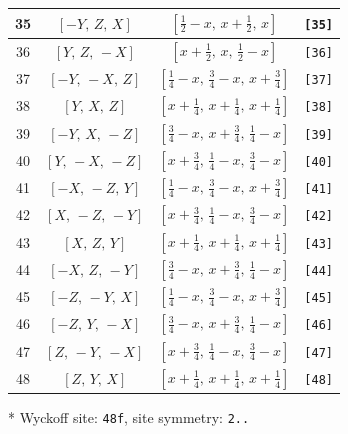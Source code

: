 \documentclass[fleqn,8pt]{jsarticle}
\begin{document}
\begin{longtable}{cccc}
35 & $\left[ - Y,\, Z,\, X \right]$ & $\left[ \frac{1}{2} - x,\, x + \frac{1}{2},\, x \right]$ & {\tt [35]} \\ \hline
36 & $\left[ Y,\, Z,\, - X \right]$ & $\left[ x + \frac{1}{2},\, x,\, \frac{1}{2} - x \right]$ & {\tt [36]} \\ \hline
37 & $\left[ - Y,\, - X,\, Z \right]$ & $\left[ \frac{1}{4} - x,\, \frac{3}{4} - x,\, x + \frac{3}{4} \right]$ & {\tt [37]} \\ \hline
38 & $\left[ Y,\, X,\, Z \right]$ & $\left[ x + \frac{1}{4},\, x + \frac{1}{4},\, x + \frac{1}{4} \right]$ & {\tt [38]} \\ \hline
39 & $\left[ - Y,\, X,\, - Z \right]$ & $\left[ \frac{3}{4} - x,\, x + \frac{3}{4},\, \frac{1}{4} - x \right]$ & {\tt [39]} \\ \hline
40 & $\left[ Y,\, - X,\, - Z \right]$ & $\left[ x + \frac{3}{4},\, \frac{1}{4} - x,\, \frac{3}{4} - x \right]$ & {\tt [40]} \\ \hline
41 & $\left[ - X,\, - Z,\, Y \right]$ & $\left[ \frac{1}{4} - x,\, \frac{3}{4} - x,\, x + \frac{3}{4} \right]$ & {\tt [41]} \\ \hline
42 & $\left[ X,\, - Z,\, - Y \right]$ & $\left[ x + \frac{3}{4},\, \frac{1}{4} - x,\, \frac{3}{4} - x \right]$ & {\tt [42]} \\ \hline
43 & $\left[ X,\, Z,\, Y \right]$ & $\left[ x + \frac{1}{4},\, x + \frac{1}{4},\, x + \frac{1}{4} \right]$ & {\tt [43]} \\ \hline
44 & $\left[ - X,\, Z,\, - Y \right]$ & $\left[ \frac{3}{4} - x,\, x + \frac{3}{4},\, \frac{1}{4} - x \right]$ & {\tt [44]} \\ \hline
45 & $\left[ - Z,\, - Y,\, X \right]$ & $\left[ \frac{1}{4} - x,\, \frac{3}{4} - x,\, x + \frac{3}{4} \right]$ & {\tt [45]} \\ \hline
46 & $\left[ - Z,\, Y,\, - X \right]$ & $\left[ \frac{3}{4} - x,\, x + \frac{3}{4},\, \frac{1}{4} - x \right]$ & {\tt [46]} \\ \hline
47 & $\left[ Z,\, - Y,\, - X \right]$ & $\left[ x + \frac{3}{4},\, \frac{1}{4} - x,\, \frac{3}{4} - x \right]$ & {\tt [47]} \\ \hline
48 & $\left[ Z,\, Y,\, X \right]$ & $\left[ x + \frac{1}{4},\, x + \frac{1}{4},\, x + \frac{1}{4} \right]$ & {\tt [48]} \\
\end{longtable}
* Wyckoff site: {\tt 48f}, site symmetry: {\tt 2..}
\renewcommand{\arraystretch}{1.2}
\end{document}
